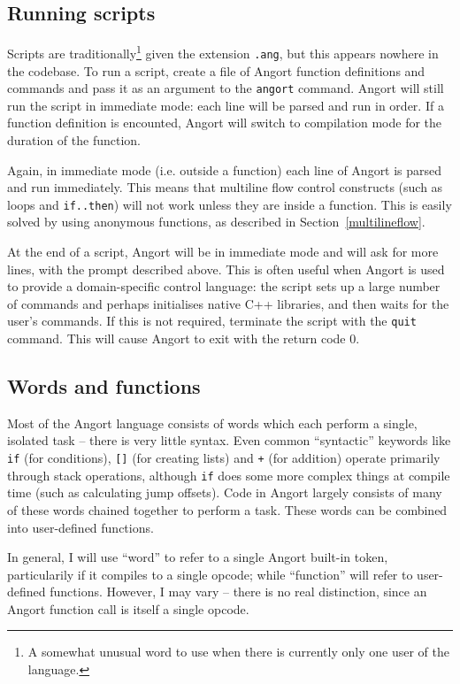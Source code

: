 \subsection{Running scripts}
Scripts are traditionally\footnote{A somewhat unusual word to use when
there is currently only one user of the language.} given the extension
\texttt{.ang}, but this appears nowhere in the codebase. To run a script,
create a file of Angort function definitions and commands and pass it as
an argument to the \texttt{angort} command. Angort will still run
the script in immediate mode: each line will be parsed
and run in order. If a function definition is encounted, Angort will switch
to compilation mode for the duration of the function.

Again, in immediate mode (i.e. outside a function) each line of Angort
is parsed and run
immediately. This means that multiline flow control constructs (such as loops
and \texttt{if..then}) will not work unless they are inside a function.
This is easily solved by using anonymous functions, as described in Section~\ref{multilineflow}.

At the end of a script, Angort will be in immediate mode and will ask for
more lines, with
the prompt described above. This is often useful
when Angort is used to provide a domain-specific control language: the script sets up
a large number of commands and perhaps initialises native C++ libraries, and then
waits for the user's commands. If this is not required, terminate the script with
the \texttt{quit} command. This will cause Angort to exit with the return code 0.

\subsection{Words and functions}
Most of the Angort language consists of words which each perform
a single, isolated task -- there is very little syntax. Even common
``syntactic'' keywords like \texttt{if} (for conditions), \texttt{[]} 
(for creating lists) and \texttt{+} (for addition) operate primarily through
stack operations, although \texttt{if} does some more complex things at compile time
(such as calculating jump offsets). Code in Angort largely consists of many of these words
chained together to perform a task. These words can be combined into user-defined
functions.

In general, I will use ``word'' to refer to a single Angort built-in token,
particularily if it compiles to a single opcode; while ``function'' will refer
to user-defined functions. However, I may vary -- there is no real distinction, since
an Angort function call is itself a single opcode.
\clearpage
